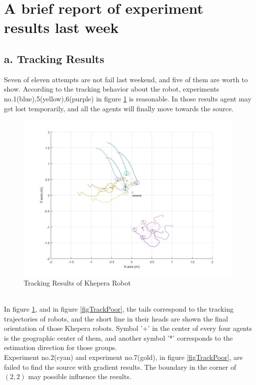 \documentclass{article}
\begin{document}
\section*{A brief report of experiment results last week}
\vspace{2cm}
\subsection*{a. Tracking Results}
Seven of eleven attempts are not fail last weekend, and five of them are worth to show. 
According to the tracking behavior about the robot, experiments no.1(blue),5(yellow),6(purple) in figure \ref{figTrackGood} is reasonable. 
In those results agent may get lost temporarily, and all the agents will finally move towards the source.
\begin{figure}[htbp]
\centering
\includegraphics[width=12cm]{TrackingresultGood} 
\caption{Tracking Results of Khepera Robot}\label{figTrackGood}
\end{figure}
\\In figure \ref{figTrackGood}, and in figure \ref{figTrackPoor}, the tails correspond to the tracking trajectories of robots, 
and the short line in their heads are shown the final orientation of those Khepera robots. 
Symbol '+' in the center of every four agents is the geographic center of them, and another symbol '*' corresponds to the estimation direction for those groups. \\
Experiment no.2(cyan) and experiment no.7(gold), in figure \ref{figTrackPoor}, are failed to find the source with gradient results. 
The boundary in the corner of $(2,2)$ may possible influence the results.
\end{document}
